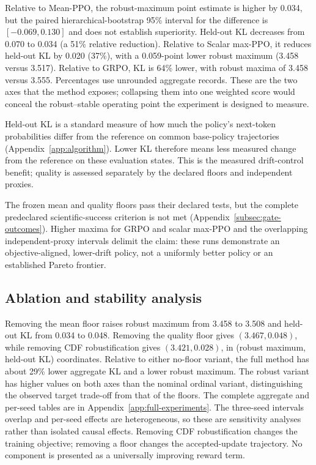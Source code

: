 \documentclass{article}
\theoremstyle{definition}
\theoremstyle{remark}
\begin{document}
Relative to Mean-PPO, the robust-maximum point estimate is higher by 0.034,
but the paired hierarchical-bootstrap 95\% interval for the difference is
$[-0.069,0.130]$ and does not establish superiority. Held-out KL decreases
from 0.070 to 0.034 (a 51\% relative reduction).
Relative to Scalar max-PPO, it reduces held-out KL by 0.020 (37\%), with a
0.059-point lower robust maximum (3.458 versus 3.517). Relative to GRPO,
KL is 64\% lower, with robust maxima of 3.458 versus 3.555. Percentages use
unrounded aggregate records. These are the two axes that the method exposes;
collapsing them into one weighted score would conceal the robust--stable
operating point the experiment is designed to measure.

Held-out KL is a standard measure of how much the policy's next-token
probabilities differ from the reference on common base-policy trajectories
(Appendix~\ref{app:algorithm}). Lower KL therefore means less measured change
from the reference on these evaluation states. This is the measured
drift-control benefit; quality is assessed separately by the declared floors
and independent proxies.

The frozen mean and quality floors pass their declared tests, but the complete
predeclared scientific-success criterion is not met
(Appendix~\ref{subsec:gate-outcomes}). Higher maxima for GRPO and scalar
max-PPO and the overlapping independent-proxy intervals delimit the claim:
these runs demonstrate an objective-aligned, lower-drift policy, not a
uniformly better policy or an established Pareto frontier.

\subsection{Ablation and stability analysis}
\label{subsec:ablation-stability-main}
Removing the mean floor raises robust maximum from 3.458 to 3.508 and
held-out KL from 0.034 to 0.048. Removing the quality floor gives
\((3.467,0.048)\), while removing CDF robustification gives
\((3.421,0.028)\), in (robust maximum, held-out KL) coordinates. Relative to either
no-floor variant, the full method has about 29\% lower aggregate KL and a lower
robust maximum. The robust variant has higher values on both axes than the
nominal ordinal variant, distinguishing the observed target trade-off from
that of the floors.
The complete aggregate and per-seed tables are in
Appendix~\ref{app:full-experiments}.
The three-seed intervals overlap and per-seed effects are heterogeneous, so
these are sensitivity analyses rather than isolated causal effects. Removing
CDF robustification changes the training objective; removing a floor changes
the accepted-update trajectory. No component is presented as a universally
improving reward term.
\end{document}

